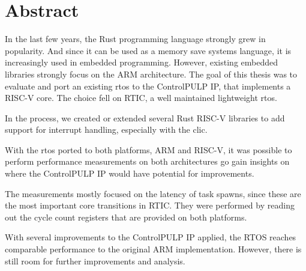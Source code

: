 \chapter*{Abstract}

In the last few years, the Rust programming language strongly grew in popularity. And since it can be used as a memory save systems language, it is increasingly used in embedded programming. However, existing embedded libraries strongly focus on the ARM architecture.
The goal of this thesis was to evaluate and port an existing \gls{rtos} to the ControlPULP IP, that implements a RISC-V core. The choice fell on RTIC, a well maintained lightweight \gls{rtos}.

In the process, we created or extended several Rust RISC-V libraries to add support for interrupt handling, especially with the \gls{clic}.

With the \gls{rtos} ported to both platforms, ARM and RISC-V, it was possible to perform performance measurements on both architectures go gain insights on where the ControlPULP IP would have potential for improvements. 

The measurements mostly focused on the latency of task spawns, since these are the most important core transitions in RTIC. They were performed by reading out the cycle count registers that are provided on both platforms.

With several improvements to the ControlPULP IP applied, the RTOS reaches comparable performance to the original ARM implementation. However, there is still room for further improvements and analysis.